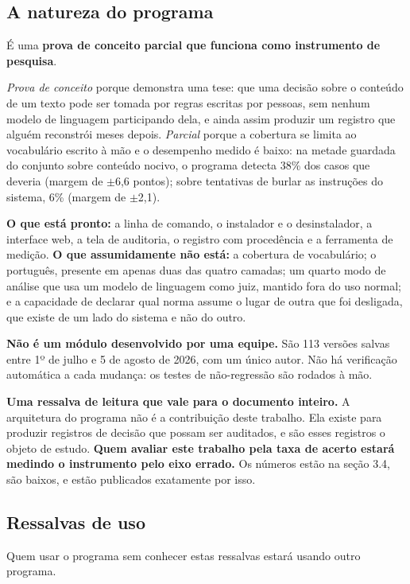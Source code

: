\documentclass[10pt]{article}
\begin{document}
\subsection{A natureza do programa}

É uma \textbf{prova de conceito parcial que funciona como instrumento de pesquisa}.

\emph{Prova de conceito} porque demonstra uma tese: que uma decisão sobre o conteúdo de um texto pode ser tomada por regras escritas por pessoas, sem nenhum modelo de linguagem participando dela, e ainda assim produzir um registro que alguém reconstrói meses depois. \emph{Parcial} porque a cobertura se limita ao vocabulário escrito à mão e o desempenho medido é baixo: na metade guardada do conjunto sobre conteúdo nocivo, o programa detecta 38\% dos casos que deveria (margem de $\pm$6,6 pontos); sobre tentativas de burlar as instruções do sistema, 6\% (margem de $\pm$2,1).

\textbf{O que está pronto:} a linha de comando, o instalador e o desinstalador, a interface web, a tela de auditoria, o registro com procedência e a ferramenta de medição. \textbf{O que assumidamente não está:} a cobertura de vocabulário; o português, presente em apenas duas das quatro camadas; um quarto modo de análise que usa um modelo de linguagem como juiz, mantido fora do uso normal; e a capacidade de declarar qual norma assume o lugar de outra que foi desligada, que existe de um lado do sistema e não do outro.

\textbf{Não é um módulo desenvolvido por uma equipe.} São 113 versões salvas entre 1º de julho e 5 de agosto de 2026, com um único autor. Não há verificação automática a cada mudança: os testes de não-regressão são rodados à mão.

\textbf{Uma ressalva de leitura que vale para o documento inteiro.} A arquitetura do programa não é a contribuição deste trabalho. Ela existe para produzir registros de decisão que possam ser auditados, e são esses registros o objeto de estudo. \textbf{Quem avaliar este trabalho pela taxa de acerto estará medindo o instrumento pelo eixo errado.} Os números estão na seção 3.4, são baixos, e estão publicados exatamente por isso.

\subsection{Ressalvas de uso}

Quem usar o programa sem conhecer estas ressalvas estará usando outro programa.
\end{document}
